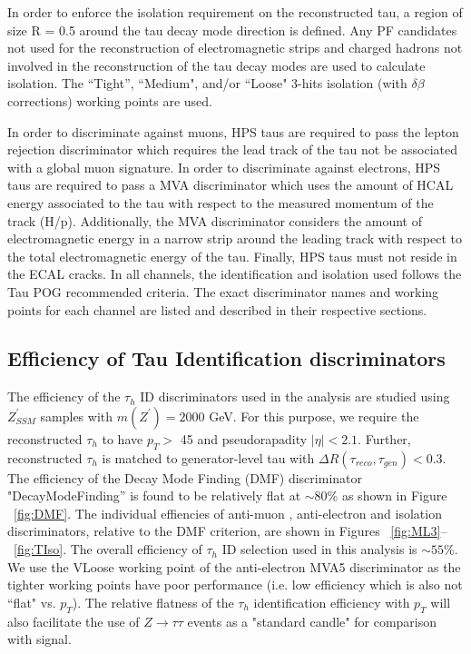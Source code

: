 In order to enforce the isolation requirement on the reconstructed tau, a region of size R = 0.5 around the tau decay 
mode direction is defined. Any PF candidates not used for the reconstruction of electromagnetic strips and charged 
hadrons not involved in the reconstruction of the tau decay modes are used to calculate isolation. The ``Tight'', ``Medium", and/or ``Loose" 3-hits isolation 
(with $\delta\beta$ corrections)  working points are used. 

In order to discriminate against muons, HPS taus are required to pass the lepton rejection 
discriminator which requires the lead track of the tau not be associated with a global muon signature. In order to 
discriminate against electrons, HPS taus are required to pass a MVA discriminator which uses the amount of HCAL energy 
associated to the tau with respect to the measured momentum of the track (H/p). Additionally, the MVA discriminator 
considers the amount of electromagnetic energy in a narrow strip around the leading track with respect to the total 
electromagnetic energy of the tau. Finally, HPS taus must not reside in the ECAL cracks. 
In all channels, the identification and isolation used follows the Tau POG recommended criteria.
The exact discriminator names and working points for each channel are listed and described in their respective sections.




\subsection{Efficiency of Tau Identification discriminators} \label{sec:tauIDeff}
The efficiency of the $\tau_{h}$ ID discriminators used in the analysis are studied using $Z^{\prime}_{SSM}$ samples with $m(Z^{\prime}) = 2000$ GeV. For this purpose, we require the reconstructed $\tau_{h}$ to have $p_{T} >$ 45 \gev and pseudorapadity $|\eta| < 2.1$. Further, reconstructed $\tau_{h}$ is matched to generator-level tau with $\Delta R(\tau_{reco},\tau_{gen}) < 0.3$. The efficiency of the Decay Mode Finding (DMF) discriminator  "DecayModeFinding'' is found to be relatively flat at $\sim 80$\% as shown in Figure ~\ref{fig:DMF}. The individual effiencies of anti-muon , anti-electron and isolation discriminators, relative to the DMF criterion, are shown in Figures ~\ref{fig:ML3}--~\ref{fig:TIso}. The overall efficiency of $\tau_{h}$ ID selection used in this analysis is $\sim 55$\%. We use the VLoose working point of the anti-electron MVA5 discriminator as the tighter working points have poor performance (i.e. low efficiency which is also not ``flat" vs. $p_{T}$). The relative flatness of the $\tau_{h}$ identification efficiency with $p_{T}$ will also facilitate the use of $Z\rightarrow\tau\tau$ events as a "standard candle" for comparison with signal. 


